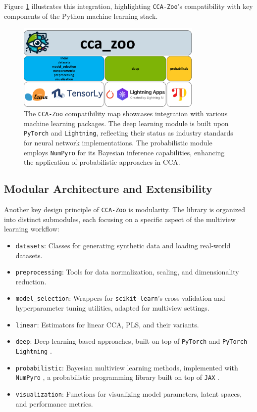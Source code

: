 Figure \ref{fig:cca-zoo-api} illustrates this integration, highlighting \texttt{CCA-Zoo}'s compatibility with key components of the Python machine learning stack.

\begin{figure}[ht]
\centering
\includegraphics[width=0.8\textwidth]{figures/CCA_Zoo_map}
\caption[The \texttt{CCA-Zoo} compatibility map]{The \texttt{CCA-Zoo} compatibility map showcases integration with various machine learning packages. The deep learning module is built upon \texttt{PyTorch} and \texttt{Lightning}, reflecting their status as industry standards for neural network implementations. The probabilistic module employs \texttt{NumPyro} for its Bayesian inference capabilities, enhancing the application of probabilistic approaches in CCA.}
\label{fig:cca-zoo-api}
\end{figure}

\subsection{Modular Architecture and Extensibility}

Another key design principle of \texttt{CCA-Zoo} is modularity. The library is organized into distinct submodules, each focusing on a specific aspect of the multiview learning workflow:

\begin{itemize}
\item \texttt{datasets}: Classes for generating synthetic data and loading real-world datasets.
\item \texttt{preprocessing}: Tools for data normalization, scaling, and dimensionality reduction.
\item \texttt{model\_selection}: Wrappers for \texttt{scikit-learn}'s cross-validation and hyperparameter tuning utilities, adapted for multiview settings.
\item \texttt{linear}: Estimators for linear CCA, PLS, and their variants.
\item \texttt{deep}: Deep learning-based approaches, built on top of \texttt{PyTorch} \citep{paszke2019pytorch} and \texttt{PyTorch Lightning} \citep{falcon2019pytorch}.
\item \texttt{probabilistic}: Bayesian multiview learning methods, implemented with \texttt{NumPyro} \citep{phan2019composable}, a probabilistic programming library built on top of \texttt{JAX} \citep{jax2018github}.
\item \texttt{visualization}: Functions for visualizing model parameters, latent spaces, and performance metrics.
\end{itemize}

